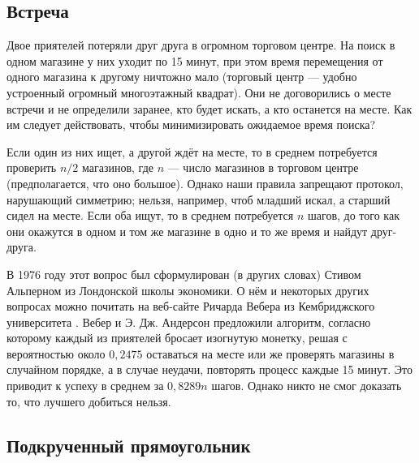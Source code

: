 \subsection*{Встреча}

Двое приятелей потеряли друг друга в огромном торговом центре. %
На поиск в одном магазине у них уходит по 15 минут,
при этом время перемещения от одного магазина к другому ничтожно мало
(торговый центр --- удобно устроенный огромный многоэтажный квадрат).
Они не договорились о месте встречи и не определили заранее, кто будет искать, а кто останется на месте.
Как им следует действовать, чтобы минимизировать ожидаемое время поиска?

\medskip

Если один из них ищет, а другой ждёт на месте, то в среднем потребуется проверить $n/2$ магазинов, где $n$ --- число магазинов в торговом центре (предполагается, что оно большое).
Однако наши правила запрещают протокол, нарушающий симметрию;
нельзя, например, чтоб младший искал, а старший сидел на месте.
Если оба ищут, то в среднем потребуется $n$ шагов, до того как они окажутся в одном и том же магазине в одно и то же время и найдут друг-друга.

В 1976 году этот вопрос был сформулирован (в других словах) Стивом Альперном из Лондонской школы экономики.
О нём и некоторых других вопросах можно почитать на веб-сайте Ричарда Вебера из Кембриджского университета \cite{weber}.
Вебер и Э. Дж. Андерсон предложили алгоритм, согласно которому каждый из приятелей бросает изогнутую монетку, решая с вероятностью около $0{,}2475$ оставаться на месте или же проверять магазины в случайном порядке, а в случае неудачи, повторять процесс каждые 15 минут.
Это приводит к успеху в среднем за $0{,}8289n$ шагов.
Однако никто не смог доказать то, что лучшего добиться нельзя.



\subsection*{Подкрученный прямоугольник}

